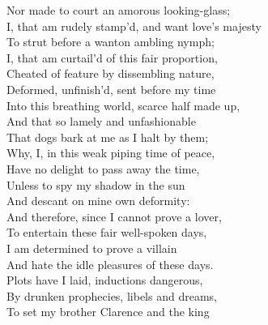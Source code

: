\documentclass{article}
\begin{document}
\begin{description}
\hspace{1pt}Nor made to court an amorous looking-glass;\\
\hspace{1pt}I, that am rudely stamp'd, and want love's majesty\\
\hspace{1pt}To strut before a wanton ambling nymph;\\
\hspace{1pt}I, that am curtail'd of this fair proportion,\\
\hspace{1pt}Cheated of feature by dissembling nature,\\
\hspace{1pt}Deformed, unfinish'd, sent before my time\\
\hspace{1pt}Into this breathing world, scarce half made up,\\
\hspace{1pt}And that so lamely and unfashionable\\
\hspace{1pt}That dogs bark at me as I halt by them;\\
\hspace{1pt}Why, I, in this weak piping time of peace,\\
\hspace{1pt}Have no delight to pass away the time,\\
\hspace{1pt}Unless to spy my shadow in the sun\\
\hspace{1pt}And descant on mine own deformity:\\
\hspace{1pt}And therefore, since I cannot prove a lover,\\
\hspace{1pt}To entertain these fair well-spoken days,\\
\hspace{1pt}I am determined to prove a villain\\
\hspace{1pt}And hate the idle pleasures of these days.\\
\hspace{1pt}Plots have I laid, inductions dangerous,\\
\hspace{1pt}By drunken prophecies, libels and dreams,\\
\hspace{1pt}To set my brother Clarence and the king\\

\end{description}
\end{document}
